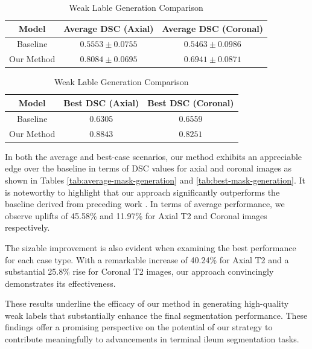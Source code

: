 \begin{table}[ht]
    \begin{subtable}[b]{\textwidth}
        \centering
        \begin{tabular}{c | c | c}
        Model & Average DSC (Axial) & Average DSC (Coronal) \\
        \hline
        Baseline & \(0.5553 \pm 0.0755\)  & \(0.5463 \pm 0.0986\)\\
        \hline
        Our Method & \(\mathbf{0.8084 \pm 0.0695}\) & \(\mathbf{0.6941 \pm 0.0871}\) 
       \end{tabular}
       \caption{Average Case Comparison}
       \label{tab:average-mask-generation}
    \end{subtable}
    \vfill
    \begin{subtable}[b]{\textwidth}
        \centering
        \begin{tabular}{c | c | c}
        Model & Best DSC (Axial) & Best DSC (Coronal) \\
        \hline
        Baseline & 0.6305 & 0.6559\\
        \hline
        Our Method & \(\mathbf{0.8843}\) & \(\mathbf{0.8251}\)
       \end{tabular}
       \caption{Best Case Comparison}
       \label{tab:best-mask-generation}
    \end{subtable}
     \caption{Weak Lable Generation Comparison}
     \label{tab:mask-generation-comparison}
\end{table}

In both the average and best-case scenarios, our method exhibits an appreciable edge over the baseline in terms of DSC values for axial and coronal images as shown in Tables \ref{tab:average-mask-generation} and \ref{tab:best-mask-generation}. It is noteworthy to highlight that our approach significantly outperforms the baseline derived from preceding work \cite{Ali2022}. In terms of average performance, we observe uplifts of 45.58\% and 11.97\% for Axial T2 and Coronal images respectively.

The sizable improvement is also evident when examining the best performance for each case type. With a remarkable increase of 40.24\% for Axial T2 and a substantial 25.8\% rise for Coronal T2 images, our approach convincingly demonstrates its effectiveness.

These results underline the efficacy of our method in generating high-quality weak labels that substantially enhance the final segmentation performance. These findings offer a promising perspective on the potential of our strategy to contribute meaningfully to advancements in terminal ileum segmentation tasks.

